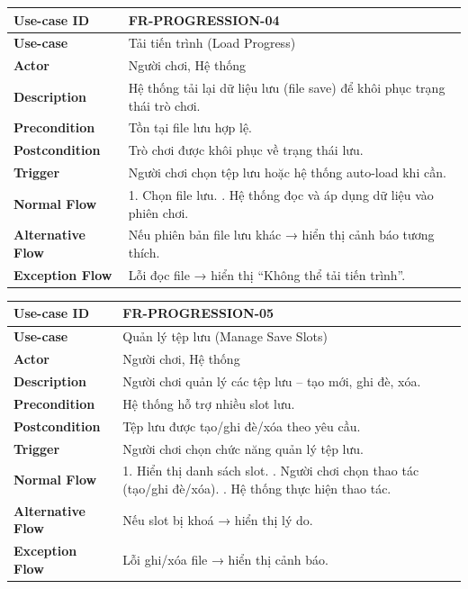 \begin{table}[H]
\centering
\begin{tabular}{|p{4cm}|p{10cm}|}
\hline
\textbf{Use-case ID} & FR-PROGRESSION-04 \\ \hline
\textbf{Use-case} & Tải tiến trình (Load Progress) \\ \hline
\textbf{Actor} & Người chơi, Hệ thống \\ \hline
\textbf{Description} & Hệ thống tải lại dữ liệu lưu (file save) để khôi phục trạng thái trò chơi. \\ \hline
\textbf{Precondition} & Tồn tại file lưu hợp lệ. \\ \hline
\textbf{Postcondition} & Trò chơi được khôi phục về trạng thái lưu. \\ \hline
\textbf{Trigger} & Người chơi chọn tệp lưu hoặc hệ thống auto-load khi cần. \\ \hline
\textbf{Normal Flow} &
1. Chọn file lưu. \newline
2. Hệ thống đọc và áp dụng dữ liệu vào phiên chơi. \\ \hline
\textbf{Alternative Flow} &
Nếu phiên bản file lưu khác → hiển thị cảnh báo tương thích. \\ \hline
\textbf{Exception Flow} &
Lỗi đọc file → hiển thị “Không thể tải tiến trình”. \\ \hline
\end{tabular}
\end{table}


\begin{table}[H]
\centering
\begin{tabular}{|p{4cm}|p{10cm}|}
\hline
\textbf{Use-case ID} & FR-PROGRESSION-05 \\ \hline
\textbf{Use-case} & Quản lý tệp lưu (Manage Save Slots) \\ \hline
\textbf{Actor} & Người chơi, Hệ thống \\ \hline
\textbf{Description} & Người chơi quản lý các tệp lưu – tạo mới, ghi đè, xóa. \\ \hline
\textbf{Precondition} & Hệ thống hỗ trợ nhiều slot lưu. \\ \hline
\textbf{Postcondition} & Tệp lưu được tạo/ghi đè/xóa theo yêu cầu. \\ \hline
\textbf{Trigger} & Người chơi chọn chức năng quản lý tệp lưu. \\ \hline
\textbf{Normal Flow} &
1. Hiển thị danh sách slot. \newline
2. Người chơi chọn thao tác (tạo/ghi đè/xóa). \newline
3. Hệ thống thực hiện thao tác. \\ \hline
\textbf{Alternative Flow} &
Nếu slot bị khoá → hiển thị lý do. \\ \hline
\textbf{Exception Flow} &
Lỗi ghi/xóa file → hiển thị cảnh báo. \\ \hline
\end{tabular}
\end{table}

